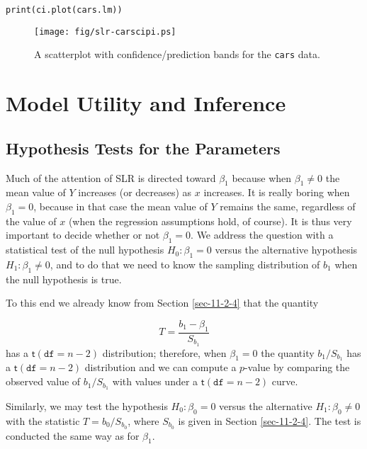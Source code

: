 \begin{verbatim}
print(ci.plot(cars.lm))
\end{verbatim}

\begin{figure}[ht!]
\centering
\texttt{[image: fig/slr-carscipi.ps]}
\caption[Scatterplot with confidence/prediction bands for the \texttt{cars} data]{\label{fig-carscipi}\small A scatterplot with confidence/prediction bands for the \texttt{cars} data.}
\end{figure}

\section{Model Utility and Inference}
\label{sec-11-3}

\subsection{Hypothesis Tests for the Parameters}
\label{sec-11-3-1}

Much of the attention of SLR is directed toward \(\beta_{1}\) because
when \( \beta_{1}\neq 0 \) the mean value of \(Y\) increases (or
decreases) as \(x\) increases. It is really boring when
\(\beta_{1}=0\), because in that case the mean value of \(Y\) remains
the same, regardless of the value of \(x\) (when the regression
assumptions hold, of course). It is thus very important to decide
whether or not \( \beta_{1} = 0 \). We address the question with a
statistical test of the null hypothesis \(H_{0}:\beta_{1}=0\) versus
the alternative hypothesis \(H_{1}:\beta_{1}\neq0\), and to do that we
need to know the sampling distribution of \(b_{1}\) when the null
hypothesis is true.

To this end we already know from Section \ref{sec-11-2-4} that
the quantity

\begin{equation} 
T=\frac{b_{1}-\beta_{1}}{S_{b_{1}}}
\end{equation}
has a \(\mathsf{t}(\mathtt{df}=n-2)\) distribution; therefore, when
\(\beta_{1}=0\) the quantity \(b_{1}/S_{b_{1}}\) has a
\(\mathsf{t}(\mathtt{df}=n-2)\) distribution and we can compute a
\(p\)-value by comparing the observed value of \(b_{1}/S{}_{b_{1}}\)
with values under a \(\mathsf{t}(\mathtt{df}=n-2)\) curve.

Similarly, we may test the hypothesis \(H_{0}:\beta_{0}=0\) versus the
alternative \(H_{1}:\beta_{0}\neq0\) with the statistic
\(T=b_{0}/S_{b_{0}}\), where \(S_{b_{0}}\) is given in Section \ref{sec-11-2-4}. The test is conducted the same way as for
\(\beta_{1}\).


